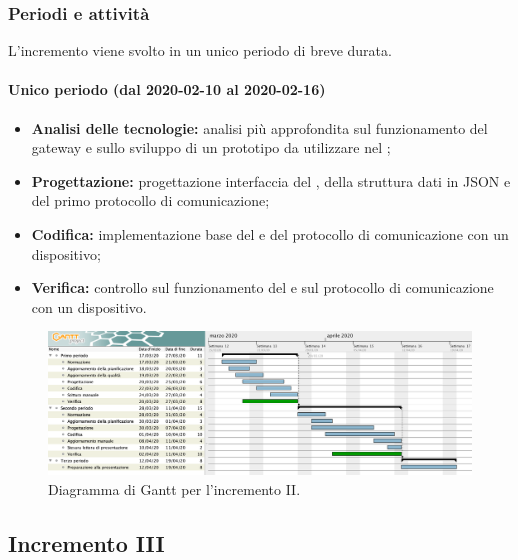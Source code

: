 			\subsubsection{Periodi e attività}
			
				L'incremento viene svolto in un unico periodo di breve durata.
				
				\paragraph{Unico periodo (dal 2020-02-10 al 2020-02-16)}
				
					\begin{itemize}
						\item \textbf{Analisi delle tecnologie:} analisi più approfondita sul funzionamento del gateway e sullo sviluppo di un prototipo da utilizzare nel ;	
						\item \textbf{Progettazione:} progettazione interfaccia del , della struttura dati in JSON e del primo protocollo di comunicazione;
						\item \textbf{Codifica:} implementazione base del  e del protocollo di comunicazione con un dispositivo;
						\item \textbf{Verifica:} controllo sul funzionamento del  e sul protocollo di comunicazione con un dispositivo.
					\end{itemize} 			

		\begin{landscape}
          \begin{figure}[H]
            \centering
            \includegraphics[width=\linewidth]{images/ganttDettaglioCodifica} %
            \caption{Diagramma di Gantt per l'incremento II.}
          \end{figure}		
		\end{landscape}


		\subsection{Incremento III}
			
